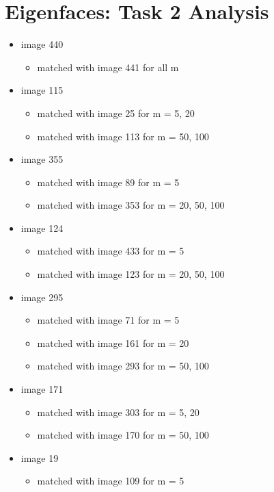 \documentclass{article}
\begin{document}
\section{Eigenfaces: Task 2 Analysis}

\begin{itemize}
    \item image 440
    \begin{itemize}
        \item matched with image 441 for all m
    \end{itemize}
    \item image 115
    \begin{itemize}
        \item matched with image 25 for m = 5, 20
        \item matched with image 113 for m = 50, 100
    \end{itemize}
    \item image 355
    \begin{itemize}
        \item matched with image 89 for m = 5
        \item matched with image 353 for m = 20, 50, 100
    \end{itemize}
    \item image 124
    \begin{itemize}
        \item matched with image 433 for m = 5
        \item matched with image 123 for m = 20, 50, 100
    \end{itemize}
    \item image 295
    \begin{itemize}
        \item matched with image 71 for m = 5
        \item matched with image 161 for m = 20
        \item matched with image 293 for m = 50, 100
    \end{itemize}
    \item image 171
    \begin{itemize}
        \item matched with image 303 for m = 5, 20
        \item matched with image 170 for m = 50, 100
    \end{itemize}
    \item image 19
    \begin{itemize}
        \item matched with image 109 for m = 5

\end{itemize}
\end{itemize}
\end{document}
